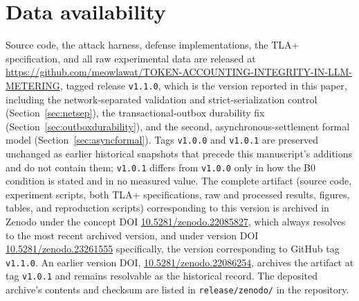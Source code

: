 \documentclass[manuscript,review]{acmart}
\begin{document}
\section*{Data availability}
Source code, the attack harness, defense implementations, the TLA+ specification, and all
raw experimental data are released at
\url{https://github.com/meowlawat/TOKEN-ACCOUNTING-INTEGRITY-IN-LLM-METERING}, tagged
release \texttt{v1.1.0}, which is the version reported in this paper, including the
network-separated validation and strict-serialization control (Section~\ref{sec:netsep}),
the transactional-outbox durability fix (Section~\ref{sec:outboxdurability}), and the
second, asynchronous-settlement formal model (Section~\ref{sec:asyncformal}). Tags
\texttt{v1.0.0} and
\texttt{v1.0.1} are preserved unchanged as earlier historical snapshots that precede this
manuscript's additions and do not contain them; \texttt{v1.0.1} differs from
\texttt{v1.0.0} only in how the B0 condition is stated and in no measured value. The
complete artifact (source code, experiment scripts, both TLA+ specifications, raw and
processed results, figures, tables, and reproduction scripts) corresponding to this
version is archived in Zenodo under the concept DOI
\href{https://doi.org/10.5281/zenodo.22085827}{10.5281/zenodo.22085827}, which always
resolves to the most recent archived version, and under version DOI
\href{https://doi.org/10.5281/zenodo.23261555}{10.5281/zenodo.23261555} specifically, the
version corresponding to GitHub tag \texttt{v1.1.0}. An earlier version DOI,
\href{https://doi.org/10.5281/zenodo.22086254}{10.5281/zenodo.22086254}, archives the
artifact at tag \texttt{v1.0.1} and remains resolvable as the historical record. The
deposited archive's contents and checksum are listed in \texttt{release/zenodo/} in the
repository.



\end{document}
